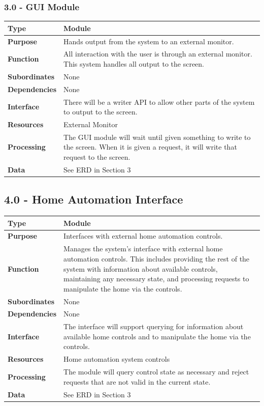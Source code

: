 \documentclass{article}
\begin{document}
\subsubsection*{3.0 - GUI Module}
\begin{tabular}{ | l |  p{13.3cm} |}
\hline
\textbf{Type} & Module \\ \hline
\textbf{Purpose} & Hands output from the system to an external monitor. \\ \hline
\textbf{Function} & All interaction with the user is through an external monitor. This system handles all output to the screen. \\ \hline
\textbf{Subordinates} & None \\ \hline
\textbf{Dependencies} & None \\ \hline
\textbf{Interface} & There will be a writer API to allow other parts of the system to output to the screen. \\ \hline
\textbf{Resources} & External Monitor \\ \hline
\textbf{Processing} & The GUI module will wait until given something to write to the screen. When it is given a request, it will write that request to the screen. \\ \hline
\textbf{Data} & See ERD in Section 3 \\ \hline
\end{tabular}

\subsection*{4.0 - Home Automation Interface}
\begin{tabular}{ | l |  p{13.3cm} |}
\hline
\textbf{Type} & Module \\ \hline
\textbf{Purpose} & Interfaces with external home automation controls. \\ \hline
\textbf{Function} & Manages the system's interface with external home
automation controls. This includes providing the rest of the system with
information about available controls, maintaining any necessary state, and
processing requests to manipulate the home via the controls. \\ \hline
\textbf{Subordinates} & None \\ \hline
\textbf{Dependencies} & None \\ \hline
\textbf{Interface} & The interface will support querying for information about
available home controls and to manipulate the home via the controls. \\ \hline
\textbf{Resources} & Home automation system controls \\ \hline
\textbf{Processing} & The module will query control state as necessary and
reject requests that are not valid in the current state. \\ \hline
\textbf{Data} & See ERD in Section 3 \\ \hline
\end{tabular}
\end{document}
